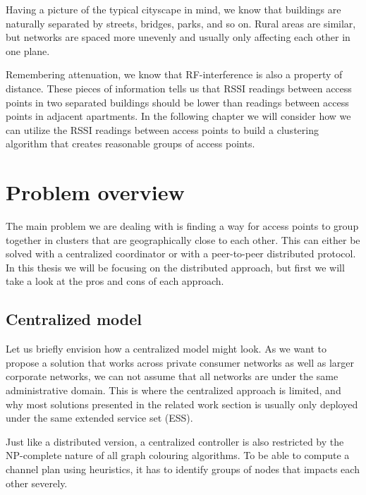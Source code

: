 Having a picture of the typical cityscape in mind, we know that buildings are naturally
separated by streets, bridges, parks, and so on. Rural areas are similar, but networks are spaced more unevenly
and usually only affecting each other in one plane.

Remembering attenuation, we know that RF-interference is also a property of distance. 
These pieces of information tells us that RSSI readings between access points in two separated buildings should be lower than readings between access points in adjacent apartments.
In the following chapter we will consider how we can utilize the RSSI readings between access points to build a clustering algorithm that creates reasonable groups of access points. 


\section{Problem overview}
The main problem we are dealing with is finding a way for access points to group together in clusters that are geographically close to each other. This can either be solved with a centralized
coordinator or with a peer-to-peer distributed protocol. In this thesis we will be focusing on the distributed approach, but first we will take a look at the pros and cons of each approach.

\subsection{Centralized model}
Let us briefly envision how a centralized model might look. As we want to propose a solution that works across private consumer networks as well as larger corporate networks,
we can not assume that all networks are under the same administrative domain. This is where the centralized approach is limited, and why most solutions presented in the related work section is usually only deployed under the same extended service set (ESS).

Just like a distributed version, a centralized controller is also restricted by the NP-complete nature of all graph colouring algorithms.
To be able to compute a channel plan using heuristics, it has to identify groups of nodes that impacts each other severely. 

